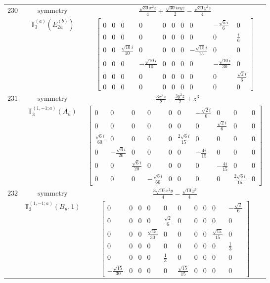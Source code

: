 \documentclass[fleqn,8pt,landscape]{jsarticle}
\begin{document}
\begin{longtable}{ccc}
$ 230 $ & $ \text{symmetry} $ & $ \frac{\sqrt{30} x^{2} z}{4} + \frac{\sqrt{30} i x y z}{2} - \frac{\sqrt{30} y^{2} z}{4} $ \\
$  $ & $ \mathbb{T}_{3}^{(a)}(E_{2u}^{(b)}) $ & $ \begin{bmatrix} 0 & 0 & 0 & 0 & 0 & 0 & 0 & 0 & - \frac{\sqrt{5} i}{6} & 0 \\ 0 & 0 & 0 & 0 & 0 & 0 & 0 & 0 & 0 & \frac{i}{6} \\ 0 & 0 & \frac{\sqrt{10} i}{10} & 0 & 0 & 0 & 0 & - \frac{\sqrt{15} i}{15} & 0 & 0 \\ 0 & 0 & 0 & - \frac{\sqrt{10} i}{10} & 0 & 0 & 0 & 0 & - \frac{\sqrt{10} i}{30} & 0 \\ 0 & 0 & 0 & 0 & 0 & 0 & 0 & 0 & 0 & \frac{\sqrt{2} i}{6} \\ 0 & 0 & 0 & 0 & 0 & 0 & 0 & 0 & 0 & 0 \end{bmatrix} $ \\ \hline
$ 231 $ & $ \text{symmetry} $ & $ - \frac{3 x^{2} z}{2} - \frac{3 y^{2} z}{2} + z^{3} $ \\
$  $ & $ \mathbb{T}_{3}^{(1,-1;a)}(A_{u}) $ & $ \begin{bmatrix} 0 & 0 & 0 & 0 & 0 & 0 & - \frac{\sqrt{2} i}{6} & 0 & 0 & 0 \\ 0 & 0 & 0 & 0 & 0 & 0 & 0 & \frac{\sqrt{2} i}{6} & 0 & 0 \\ \frac{\sqrt{6} i}{60} & 0 & 0 & 0 & 0 & \frac{2 \sqrt{6} i}{15} & 0 & 0 & 0 & 0 \\ 0 & - \frac{\sqrt{6} i}{20} & 0 & 0 & 0 & 0 & - \frac{4 i}{15} & 0 & 0 & 0 \\ 0 & 0 & \frac{\sqrt{6} i}{20} & 0 & 0 & 0 & 0 & - \frac{4 i}{15} & 0 & 0 \\ 0 & 0 & 0 & - \frac{\sqrt{6} i}{60} & 0 & 0 & 0 & 0 & \frac{2 \sqrt{6} i}{15} & 0 \end{bmatrix} $ \\ \hline
$ 232 $ & $ \text{symmetry} $ & $ \frac{3 \sqrt{10} x^{2} y}{4} - \frac{\sqrt{10} y^{3}}{4} $ \\
$  $ & $ \mathbb{T}_{3}^{(1,-1;a)}(B_{u},1) $ & $ \begin{bmatrix} 0 & 0 & 0 & 0 & 0 & 0 & 0 & 0 & 0 & - \frac{\sqrt{2}}{6} \\ 0 & 0 & 0 & 0 & \frac{\sqrt{2}}{6} & 0 & 0 & 0 & 0 & 0 \\ 0 & 0 & 0 & \frac{\sqrt{15}}{30} & 0 & 0 & 0 & 0 & \frac{\sqrt{15}}{15} & 0 \\ 0 & 0 & 0 & 0 & 0 & 0 & 0 & 0 & 0 & \frac{1}{3} \\ 0 & 0 & 0 & 0 & \frac{1}{3} & 0 & 0 & 0 & 0 & 0 \\ - \frac{\sqrt{15}}{30} & 0 & 0 & 0 & 0 & \frac{\sqrt{15}}{15} & 0 & 0 & 0 & 0 \end{bmatrix} $ \\ \hline

\end{longtable}
\end{document}
